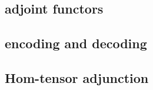 \subsection{adjoint functors}









\subsection{encoding and decoding}




\subsection{Hom-tensor adjunction}


